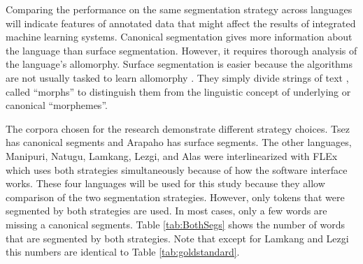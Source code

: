 Comparing the performance on the same segmentation strategy across languages will indicate features of annotated data that might affect the results of integrated machine learning systems. Canonical segmentation gives more information about the language than surface segmentation. However, it requires thorough analysis of the language's allomorphy. 
Surface segmentation is easier because the algorithms are not usually tasked to learn allomorphy \citep{goldsmith_computational_2017}. They simply divide strings of text \citep{virpioja_empirical_2011}, called ``morphs'' to distinguish them from the linguistic concept of underlying or canonical ``morphemes''. 


The corpora chosen for the research demonstrate different strategy choices.  Tsez has canonical segments and Arapaho has surface segments. The other languages, Manipuri, Natugu, Lamkang, Lezgi, and Alas were interlinearized with FLEx which uses both strategies simultaneously because of how the software interface works. These four languages will be used for this study because they allow comparison of the two segmentation strategies. However, only tokens that were segmented by both strategies are used. In most cases, only a few words are missing a canonical segments. Table \ref{tab:BothSegs} shows the number of words that are segmented by both strategies. Note that except for Lamkang and Lezgi this numbers are identical to Table \ref{tab:goldstandard}.


